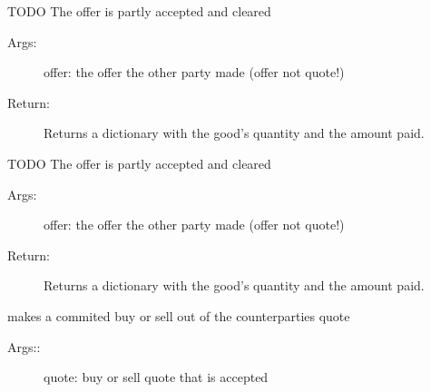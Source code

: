 \documentclass[letterpaper,10pt,english]{sphinxmanual}
\begin{document}
\begin{fulllineitems}

\begin{fulllineitems}
\label{Trade:abce.Trade.accept_partial}
TODO The offer is partly accepted and cleared
\begin{description}
\item[{Args:}] \leavevmode
offer: the offer the other party made
(offer not quote!)

\item[{Return:}] \leavevmode
Returns a dictionary with the good's quantity and the amount paid.

\end{description}

\end{fulllineitems}


\begin{fulllineitems}
\label{Trade:abce.Trade.accept_partial_max_possible}
TODO The offer is partly accepted and cleared
\begin{description}
\item[{Args:}] \leavevmode
offer: the offer the other party made
(offer not quote!)

\item[{Return:}] \leavevmode
Returns a dictionary with the good's quantity and the amount paid.

\end{description}

\end{fulllineitems}


\begin{fulllineitems}
\label{Trade:abce.Trade.accept_quote}
makes a commited buy or sell out of the counterparties quote
\begin{description}
\item[{Args::}] \leavevmode
quote: buy or sell quote that is accepted

\end{description}

\end{fulllineitems}


\end{fulllineitems}
\end{document}
